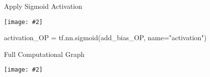 \documentclass[14pt]{beamer}
\newcommand {\framedgraphic}[2] { %
    \begin{frame}{#1}
        \begin{center}
            \texttt{[image: \#2]}
        \end{center}
    \end{frame}
}
\begin{document}
\framedgraphic{Apply Sigmoid Activation}{4-apply-sigmoid.png}

\begin{frame}[fragile]
  \begin{python}
activation_OP = tf.nn.sigmoid(add_bias_OP, name="activation")
  \end{python}
\end{frame}


\framedgraphic{Full Computational Graph}{full-graph.png}



\end{document}
